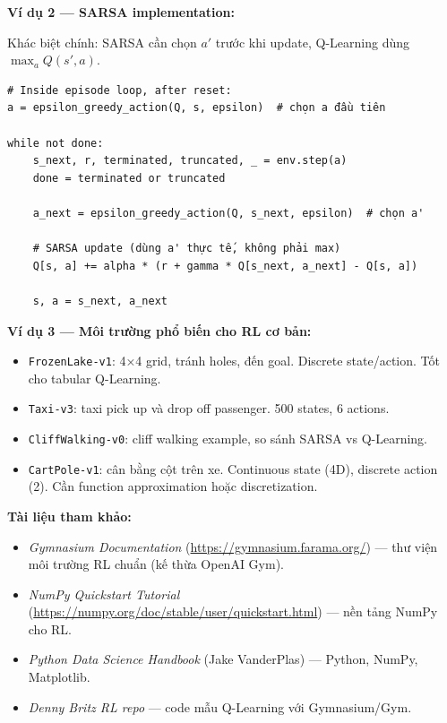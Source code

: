 \documentclass[12pt,a4paper]{article}
\begin{document}
\textbf{Ví dụ 2 --- SARSA implementation:}

Khác biệt chính: SARSA cần chọn $a'$ trước khi update, Q-Learning dùng $\max_a Q(s',a)$.

\begin{verbatim}
# Inside episode loop, after reset:
a = epsilon_greedy_action(Q, s, epsilon)  # chọn a đầu tiên

while not done:
    s_next, r, terminated, truncated, _ = env.step(a)
    done = terminated or truncated

    a_next = epsilon_greedy_action(Q, s_next, epsilon)  # chọn a'

    # SARSA update (dùng a' thực tế, không phải max)
    Q[s, a] += alpha * (r + gamma * Q[s_next, a_next] - Q[s, a])

    s, a = s_next, a_next
\end{verbatim}

\textbf{Ví dụ 3 --- Môi trường phổ biến cho RL cơ bản:}

\begin{itemize}[leftmargin=1.5em]
    \item \texttt{FrozenLake-v1}: 4×4 grid, tránh holes, đến goal. Discrete state/action. Tốt cho tabular Q-Learning.
    \item \texttt{Taxi-v3}: taxi pick up và drop off passenger. 500 states, 6 actions.
    \item \texttt{CliffWalking-v0}: cliff walking example, so sánh SARSA vs Q-Learning.
    \item \texttt{CartPole-v1}: cân bằng cột trên xe. Continuous state (4D), discrete action (2). Cần function approximation hoặc discretization.
\end{itemize}

\textbf{Tài liệu tham khảo:}
\begin{itemize}[leftmargin=1.5em]
    \item \textit{Gymnasium Documentation} (\url{https://gymnasium.farama.org/}) --- thư viện môi trường RL chuẩn (kế thừa OpenAI Gym).
    \item \textit{NumPy Quickstart Tutorial} (\url{https://numpy.org/doc/stable/user/quickstart.html}) --- nền tảng NumPy cho RL.
    \item \textit{Python Data Science Handbook} (Jake VanderPlas) --- Python, NumPy, Matplotlib.
    \item \textit{Denny Britz RL repo} --- code mẫu Q-Learning với Gymnasium/Gym.
\end{itemize}
\end{document}
